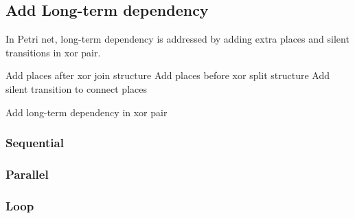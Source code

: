 \documentclass[]{article}
\begin{document}
\subsection{Add Long-term dependency}
In Petri net, long-term dependency is addressed by adding extra places and silent transitions in xor pair.  
\begin{algorithm}
	\SetAlgoLined
	Add places after xor join structure \;
	Add places before xor split structure\;
	Add silent transition to connect places\;
	\caption{Add long-term dependency in xor pair}
\end{algorithm}
\subsubsection{Sequential}

\subsubsection{Parallel}

\subsubsection{Loop}
\end{document}
